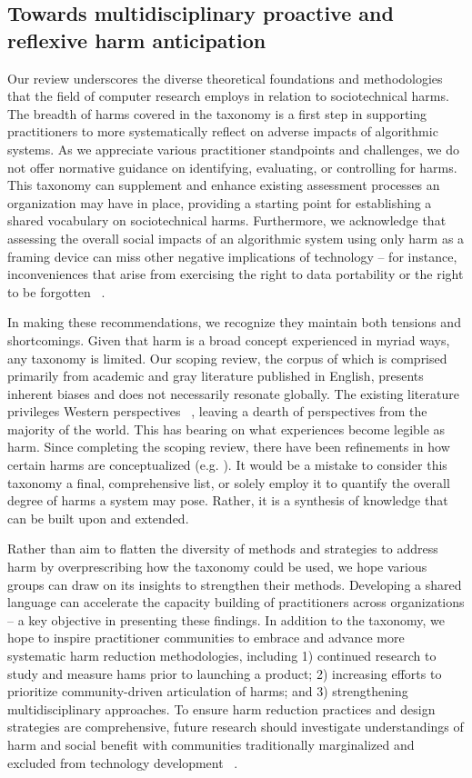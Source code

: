 \subsection{Towards multidisciplinary proactive and reflexive harm anticipation}
Our review underscores the diverse theoretical foundations and methodologies that the field of computer research employs in relation to sociotechnical harms. The breadth of harms covered in the taxonomy is a first step in supporting practitioners to more systematically reflect on adverse impacts of algorithmic systems. As we appreciate various practitioner standpoints and challenges, we do not offer normative guidance on identifying, evaluating, or controlling for harms. This taxonomy can supplement and enhance existing assessment processes an organization may have in place, providing a starting point for establishing a shared vocabulary on sociotechnical harms. Furthermore, we acknowledge that assessing the overall social impacts of an algorithmic system using only harm as a framing device can miss other negative implications of technology – for instance, inconveniences that arise from exercising the right to data portability or the right to be forgotten ~\cite{bertram2019, bourtoule2021}. 

In making these recommendations, we recognize they maintain both tensions and shortcomings. Given that harm is a broad concept experienced in myriad ways, any taxonomy is limited. Our scoping review, the corpus of which is comprised primarily from academic and gray literature published in English, presents inherent biases and does not necessarily resonate globally. The existing literature privileges Western perspectives ~\cite{Png_2022, Mohamed_Png_Isaac_2020}, leaving a dearth of perspectives from the majority of the world. This has bearing on what experiences become legible as harm. Since completing the scoping review, there have been refinements in how certain harms are conceptualized (e.g. \cite{selbst2022}). It would be a mistake to consider this taxonomy a final, comprehensive list, or solely employ it to quantify the overall degree of harms a system may pose. Rather, it is a synthesis of knowledge that can be built upon and extended. 

Rather than aim to flatten the diversity of methods and strategies to address harm by overprescribing how the taxonomy could be used, we hope various groups can draw on its insights to strengthen their methods. Developing a shared language can accelerate the capacity building of practitioners across organizations – a key objective in presenting these findings. In addition to the taxonomy, we hope to inspire practitioner communities to embrace and advance more systematic harm reduction methodologies, including 1) continued research to study and measure hams prior to launching a product; 2) increasing efforts to prioritize community-driven articulation of harms; and 3) strengthening multidisciplinary approaches. To ensure harm reduction practices and design strategies are comprehensive, future research should investigate understandings of harm and social benefit with communities traditionally marginalized and excluded from technology development ~\cite{Chuanromanee_Metoyer_2021}. 

